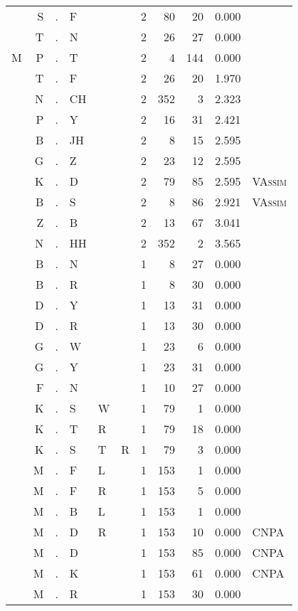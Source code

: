 \begin{longtable}{r@{ } r@{ } c@{ } l@{ } l@{ } l@{ } r r r r l }
  & S & . & F &   &   & 2 & 80 & 20 & 0.000 &  \\
  & T & . & N &   &   & 2 & 26 & 27 & 0.000 &  \\
M & P & . & T &   &   & 2 & 4 & 144 & 0.000 &  \\
  & T & . & F &   &   & 2 & 26 & 20 & 1.970 &  \\
  & N & . & CH &   &   & 2 & 352 & 3 & 2.323 &  \\
  & P & . & Y &   &   & 2 & 16 & 31 & 2.421 &  \\
  & B & . & JH &   &   & 2 & 8 & 15 & 2.595 &  \\
  & G & . & Z &   &   & 2 & 23 & 12 & 2.595 &  \\
  & K & . & D &   &   & 2 & 79 & 85 & 2.595 & \textsc{VAssim} \\
  & B & . & S &   &   & 2 & 8 & 86 & 2.921 & \textsc{VAssim} \\
  & Z & . & B &   &   & 2 & 13 & 67 & 3.041 &  \\
  & N & . & HH &   &   & 2 & 352 & 2 & 3.565 &  \\
  & B & . & N &   &   & 1 & 8 & 27 & 0.000 &  \\
  & B & . & R &   &   & 1 & 8 & 30 & 0.000 &  \\
  & D & . & Y &   &   & 1 & 13 & 31 & 0.000 &  \\
  & D & . & R &   &   & 1 & 13 & 30 & 0.000 &  \\
  & G & . & W &   &   & 1 & 23 & 6 & 0.000 &  \\
  & G & . & Y &   &   & 1 & 23 & 31 & 0.000 &  \\
  & F & . & N &   &   & 1 & 10 & 27 & 0.000 &  \\
  & K & . & S & W &   & 1 & 79 & 1 & 0.000 &  \\
  & K & . & T & R &   & 1 & 79 & 18 & 0.000 &  \\
  & K & . & S & T & R & 1 & 79 & 3 & 0.000 &  \\
  & M & . & F & L &   & 1 & 153 & 1 & 0.000 &  \\
  & M & . & F & R &   & 1 & 153 & 5 & 0.000 &  \\
  & M & . & B & L &   & 1 & 153 & 1 & 0.000 &  \\
  & M & . & D & R &   & 1 & 153 & 10 & 0.000 & \textsc{CNPA} \\
  & M & . & D &   &   & 1 & 153 & 85 & 0.000 & \textsc{CNPA} \\
  & M & . & K &   &   & 1 & 153 & 61 & 0.000 & \textsc{CNPA} \\
  & M & . & R &   &   & 1 & 153 & 30 & 0.000 &  \\

\end{longtable}
